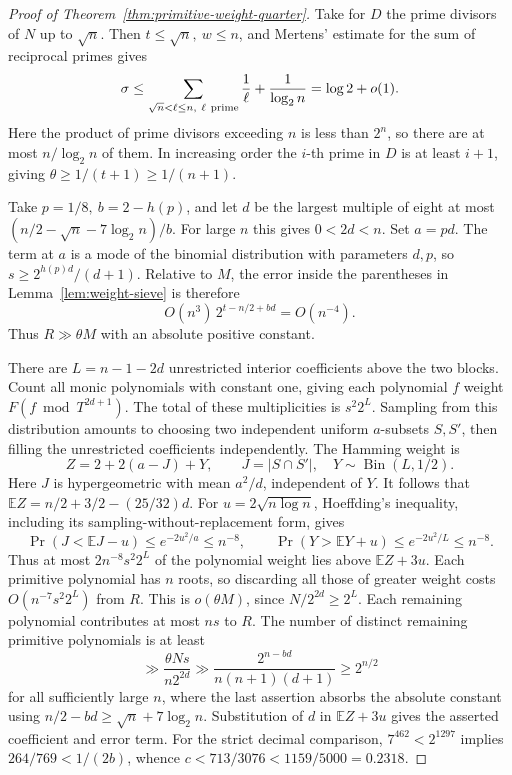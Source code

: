 \documentclass[11pt]{article}
\begin{document}
\begin{proof}[Proof of Theorem~\ref{thm:primitive-weight-quarter}]
Take for \(D\) the prime divisors of \(N\) up to \(\sqrt n\).
Then \(t\le\sqrt n,\ w\le n\), and Mertens' estimate for the sum of
reciprocal primes gives
\[
 \sigma\le \sum_{\sqrt n<\ell\le n,\ \ell\ {\rm prime}}\frac1\ell
       +\frac1{\log_2 n}=\log 2+o(1).
\]
Here the product of prime divisors exceeding \(n\) is less than
\(2^n\), so there are at most \(n/\log_2 n\) of them.
In increasing order the \(i\)-th prime in \(D\) is at least \(i+1\),
giving \(\theta\ge1/(t+1)\ge1/(n+1)\).

Take \(p=1/8,\ b=2-h(p)\), and let \(d\) be the largest multiple of
eight at most \((n/2-\sqrt n-7\log_2 n)/b\). For large \(n\) this
gives \(0<2d<n\). Set \(a=pd\). The term at \(a\) is a mode of
the binomial distribution with parameters \(d,p\), so
\(s\ge 2^{h(p)d}/(d+1)\). Relative to \(M\), the error inside the
parentheses in Lemma~\ref{lem:weight-sieve} is therefore
\[
 O(n^3)\,2^{t-n/2+bd}=O(n^{-4}).
\]
Thus \(R\gg\theta M\) with an absolute positive constant.

There are \(L=n-1-2d\) unrestricted interior coefficients above the
two blocks. Count all monic polynomials with constant one, giving
each polynomial \(f\) weight \(F(f\bmod T^{2d+1})\).
The total of these multiplicities is \(s^2 2^L\). Sampling from this
distribution amounts to choosing two independent uniform \(a\)-subsets
\(S,S'\), then filling the unrestricted coefficients independently.
The Hamming weight is
\[
 Z=2+2(a-J)+Y,\qquad J=|S\cap S'|,\quad
 Y\sim\operatorname{Bin}(L,1/2).
\]
Here \(J\) is hypergeometric with mean \(a^2/d\), independent of \(Y\).
It follows that \(\mathbb E Z=n/2+3/2-(25/32)d\).
For \(u=2\sqrt{n\log n}\), Hoeffding's inequality, including its
sampling-without-replacement form, gives
\[
 \Pr(J<\mathbb E J-u)\le e^{-2u^2/a}\le n^{-8},\qquad
 \Pr(Y>\mathbb E Y+u)\le e^{-2u^2/L}\le n^{-8}.
\]
Thus at most \(2n^{-8}s^2 2^L\) of the polynomial weight lies above
\(\mathbb E Z+3u\). Each primitive polynomial has \(n\) roots, so
discarding all those of greater weight costs \(O(n^{-7}s^2 2^L)\)
from \(R\). This is \(o(\theta M)\), since \(N/2^{2d}\ge2^L\).
Each remaining polynomial contributes at most \(ns\) to \(R\).
The number of distinct remaining primitive polynomials is at least
\[
 \gg\frac{\theta Ns}{n2^{2d}}
 \gg\frac{2^{n-bd}}{n(n+1)(d+1)}
 \ge 2^{n/2}
\]
for all sufficiently large \(n\), where the last assertion absorbs
the absolute constant using \(n/2-bd\ge\sqrt n+7\log_2 n\).
Substitution of \(d\) in \(\mathbb E Z+3u\) gives the asserted
coefficient and error term. For the strict decimal comparison,
\(7^{462}<2^{1297}\) implies \(264/769<1/(2b)\), whence
\(c<713/3076<1159/5000=0.2318\).
\end{proof}
\end{document}
